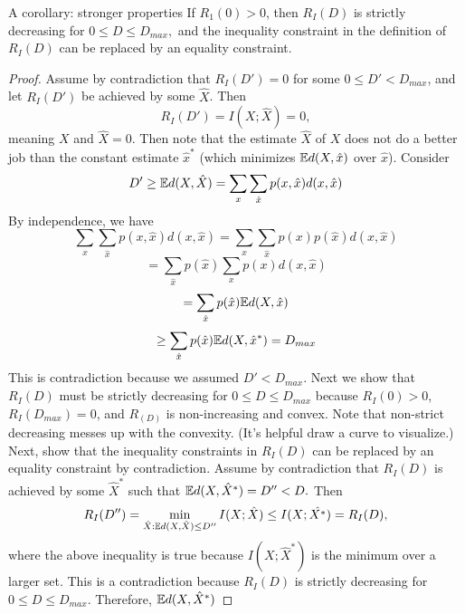 \documentclass[../main.tex]{subfiles}
\begin{document}
\begin{bbox}{A corollary: stronger properties}
    If $R_1(0) > 0$, then $R_I(D)$ is strictly decreasing for $0\leq D\leq D_{max},$ and the inequality constraint in the definition of $R_I(D)$ can be replaced by an equality constraint.
    \begin{proof}
        Assume by contradiction that $R_I(D')=0$ for some $0\leq D' < D_{max}$, and let $R_I(D')$ be achieved by some $\hat X$. Then 
        \[
        R_I(D')=I(X;\hat X)=0,
        \] meaning $X$ and $\hat X=0$. 
        \newline
        Then note that the estimate $\hat X$ of $X$ does not do a better job than the constant estimate $\hat x^*$ (which minimizes $\mathbb{E} d(X,\hat x)$ over $\hat x$). 
        Consider \[
        D' \geq \mathbb{E} d(X,\hat X) = \sum_{x}\sum_{\hat x}p(x,\hat x)d(x,\hat x)
        \]
        By independence, we have \[
        \sum_{x}\sum_{\hat x}p(x,\hat x)d(x,\hat x) = \sum_{x}\sum_{\hat x}p(x)p(\hat x)d(x,\hat x)
        \]
        \[
        =\sum_{\hat x}p(\hat x)\sum_{x}p(x)d(x,\hat x)
        \]
        \[
        =\sum_{\hat x}p(\hat x)\mathbb{E} d(X,\hat x)
        \]
        \[
        \geq \sum_{\hat x}p(\hat x)\mathbb{E} d(X,\hat x^*) = D_{max}
        \]
        This is contradiction because we assumed $D' < D_{max}.$
        \newline
        Next we show that $R_I(D)$ must be strictly decreasing for $0 \leq D\leq D_{max}$ because $R_I(0) > 0$, $R_I(D_{max})=0$, and $R_(D)$ is non-increasing and convex. Note that non-strict decreasing messes up with the convexity. (It's helpful draw a curve to visualize.)
        \newline
        Next, show that the inequality constraints in $R_I(D)$ can be replaced by an equality constraint by contradiction.
        Assume by contradiction that $R_I(D)$ is achieved by some $\hat X^*$ such that $\mathbb{E} d(X,\hat X^*) = D''<D.$ Then \[
        R_I(D'') = \min_{\hat X:\mathbb{E} d(X,\hat X)\leq D''} I(X;\hat X)\leq I(X;\hat{X^*})= R_I(D),
        \] where the above inequality is true because $I(X;\hat X^*)$ is the minimum over a larger set. This is a contradiction because $R_I(D)$ is strictly decreasing for $0\leq D\leq D_{max}.$
        \newline
        Therefore, $\mathbb{E} d(X,\hat X^*)$
    \end{proof}
\end{bbox}
\end{document}
